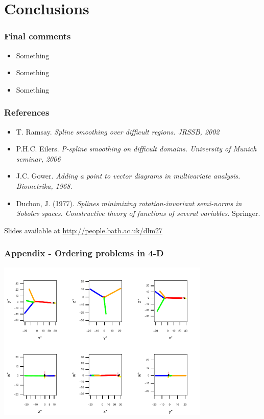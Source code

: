 \documentclass[ignorenonframetext]{beamer} %
\newcommand{\bi}{\begin{itemize}}
\newcommand{\ei}{\end{itemize}}
\begin{document}
\section{Conclusions}

\begin{frame}
	\frametitle{Final comments}
          \bi
            \item Something
            \item Something
            \item Something
           \ei
\end{frame}

\begin{frame}
	\frametitle{References}
       \bi
         \item T. Ramsay. \emph{Spline smoothing over difficult regions. JRSSB, 2002}
         \item P.H.C. Eilers. \emph{P-spline smoothing on difficult domains. University of Munich seminar, 2006}
	\item J.C. Gower. \emph{Adding a point to vector diagrams in multivariate analysis. Biometrika, 1968.}
	\item Duchon, J. (1977). \emph{Splines minimizing rotation-invariant semi-norms in Sobolev spaces. Constructive theory of functions of several variables.} Springer.
        \ei
        Slides available at \url{http://people.bath.ac.uk/dlm27}
\end{frame}

\begin{frame}
	\frametitle{Appendix - Ordering problems in 4-D}
	\centering
            \includegraphics[height=3in]{figs/comb-4d.pdf}	
\end{frame}
\end{document}
